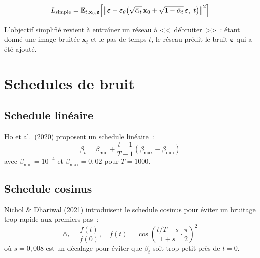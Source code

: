 \begin{formules}[title=\textbf{Objectif simplifi\'e DDPM}]
\begin{equation}
L_{\text{simple}} = \mathbb{E}_{t, \mathbf{x}_0, \boldsymbol{\varepsilon}}\!\left[\left\|\boldsymbol{\varepsilon} - \boldsymbol{\varepsilon}_\theta\!\left(\sqrt{\bar{\alpha}_t}\,\mathbf{x}_0 + \sqrt{1 - \bar{\alpha}_t}\,\boldsymbol{\varepsilon},\; t\right)\right\|^2\right]
\label{eq:ddpm-loss}
\end{equation}
\end{formules}

\begin{intuition}
L'objectif simplifi\'e revient \`a entra\^iner un r\'eseau \`a <<~d\'ebruiter~>>~:
\'etant donn\'e une image bruit\'ee $\mathbf{x}_t$ et le pas de temps $t$,
le r\'eseau pr\'edit le bruit $\boldsymbol{\varepsilon}$ qui a \'et\'e ajout\'e.
\end{intuition}

\section{Schedules de bruit}
\label{sec:noise-schedules}

\subsection{Schedule lin\'eaire}

Ho et al.\ (2020) proposent un schedule lin\'eaire~:
\begin{equation}
\beta_t = \beta_{\min} + \frac{t - 1}{T - 1}(\beta_{\max} - \beta_{\min})
\end{equation}
avec $\beta_{\min} = 10^{-4}$ et $\beta_{\max} = 0{,}02$ pour $T = 1000$.

\subsection{Schedule cosinus}

Nichol \& Dhariwal (2021) introduisent le schedule cosinus pour \'eviter
un bruitage trop rapide aux premiers pas~:
\begin{equation}
\bar{\alpha}_t = \frac{f(t)}{f(0)}, \quad f(t) = \cos\!\left(\frac{t/T + s}{1 + s} \cdot \frac{\pi}{2}\right)^2
\end{equation}
o\`u $s = 0{,}008$ est un d\'ecalage pour \'eviter que $\beta_t$ soit trop petit
pr\`es de $t = 0$.

